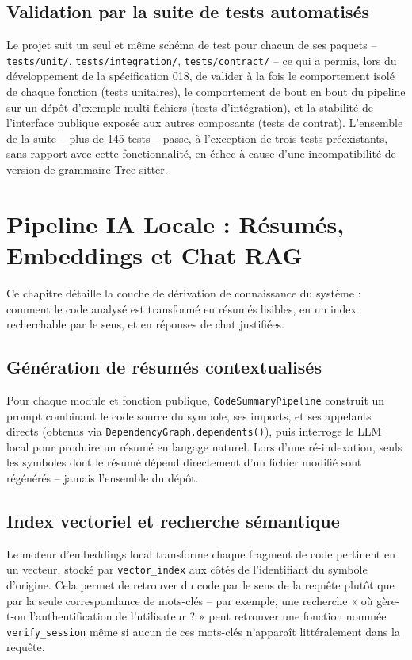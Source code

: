 \documentclass[12pt,a4paper]{report}
\begin{document}
\section{Validation par la suite de tests automatisés}
Le projet suit un seul et même schéma de test pour chacun de ses paquets --
\texttt{tests/unit/}, \texttt{tests/integration/}, \texttt{tests/contract/} -- ce
qui a permis, lors du développement de la spécification 018, de valider à la fois
le comportement isolé de chaque fonction (tests unitaires), le comportement de bout
en bout du pipeline sur un dépôt d'exemple multi-fichiers (tests d'intégration), et
la stabilité de l'interface publique exposée aux autres composants (tests de
contrat). L'ensemble de la suite -- plus de 145 tests -- passe, à l'exception de
trois tests préexistants, sans rapport avec cette fonctionnalité, en échec à cause
d'une incompatibilité de version de grammaire Tree-sitter.

\newpage

\chapter{Pipeline IA Locale : Résumés, Embeddings et Chat RAG}

Ce chapitre détaille la couche de dérivation de connaissance du système : comment
le code analysé est transformé en résumés lisibles, en un index recherchable par le
sens, et en réponses de chat justifiées.

\section{Génération de résumés contextualisés}
Pour chaque module et fonction publique, \texttt{CodeSummaryPipeline} construit un
prompt combinant le code source du symbole, ses imports, et ses appelants directs
(obtenus via \texttt{DependencyGraph.dependents()}), puis interroge le LLM local
pour produire un résumé en langage naturel. Lors d'une ré-indexation, seuls les
symboles dont le résumé dépend directement d'un fichier modifié sont régénérés --
jamais l'ensemble du dépôt.

\section{Index vectoriel et recherche sémantique}
Le moteur d'embeddings local transforme chaque fragment de code pertinent en un
vecteur, stocké par \texttt{vector\_index} aux côtés de l'identifiant du symbole
d'origine. Cela permet de retrouver du code par le sens de la requête plutôt que par
la seule correspondance de mots-clés -- par exemple, une recherche « où gère-t-on
l'authentification de l'utilisateur ? » peut retrouver une fonction nommée
\texttt{verify\_session} même si aucun de ces mots-clés n'apparaît littéralement dans
la requête.
\end{document}
